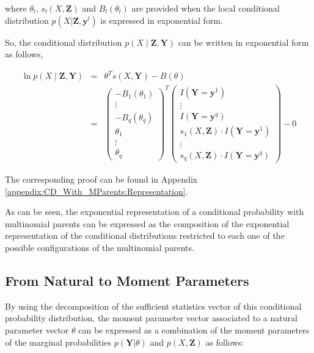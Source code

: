 \documentclass[11pt, oneside]{article}   	%
\newcommand{\bm}{\mathbf}
\numberwithin{figure}{section}
\numberwithin{equation}{section}
\numberwithin{table}{section}
\theoremstyle{definition}
\begin{document}
\noindent where $\theta_l$, $s_l(X,\bm Z)$ and $B_l(\theta_l)$ are provided when the local conditional distribution $p(X | \bm Z, \mathbf{y}^l)$ is expressed in exponential form. 

So, the conditional distribution $p(X \mid \bm Z, \bm Y)$ can be written in exponential form as follows, 

\begin{eqnarray}
\label{Equation:CD_With_MParents:Representation}
\ln p(X \mid \bm Z, \bm Y)  &=& \theta^T s(X,\mathbf{Y}) - B(\theta) \nonumber \\
&=&
\begin{pmatrix}
- B_1(\theta_{1}) \\
\vdots \\
- B_q(\theta_{q}) \\
\theta_{1} \\
\vdots \\
\theta_{q}
\end{pmatrix}^T
\begin{pmatrix}
I(\mathbf{Y} =\mathbf{y}^1) \\
\vdots \\
I(\mathbf{Y} =\mathbf{y}^q) \\
s_1(X, \bm Z) \cdot I(\mathbf{Y} =\mathbf{y}^1) \\
\vdots \\
s_q(X, \bm Z) \cdot I(\mathbf{Y} =\mathbf{y}^q)
\end{pmatrix}
- 0 
\end{eqnarray}

The corresponding proof can be found in Appendix \ref{appendix:CD_With_MParents:Representation}.

As can be seen, the exponential representation of a conditional probability with multinomial parents can be expressed as the composition of the exponential representation of the conditional distributions restricted to each one of the possible configurations of the multinomial parents. 

\subsection{From Natural to Moment Parameters}
\label{Section:CD_With_MParents:NaturalToMoment}


By using the decomposition of the sufficient statistics vector of this conditional probability distribution, the moment parameter vector associated to a natural parameter vector $\theta$ can be expressed as a combination of the moment parameters of the marginal probabilities $p(\bm Y|\theta)$ and $p(X, \bm Z)$ as follows:
\end{document}
